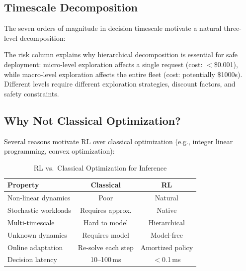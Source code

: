 \documentclass[conference,10pt]{IEEEtran}
\begin{document}
\subsection{Timescale Decomposition}

The seven orders of magnitude in decision timescale motivate a natural three-level decomposition:

\begin{table}[!htbp]
\caption{Decision Timescale Decomposition}
\label{tab:timescale}
\centering\scriptsize
{}
\end{table}

The risk column explains why hierarchical decomposition is essential for safe deployment: micro-level exploration affects a single request (cost: $<$\$0.001), while macro-level exploration affects the entire fleet (cost: potentially \$1000s). Different levels require different exploration strategies, discount factors, and safety constraints.


\subsection{Why Not Classical Optimization?}

Several reasons motivate RL over classical optimization (e.g., integer linear programming, convex optimization):

\begin{table}[!htbp]
\caption{RL vs.\ Classical Optimization for Inference}
\label{tab:whyrl}
\centering\scriptsize
\begin{tabular}{@{}lcc@{}}
\toprule
\textbf{Property} & \textbf{Classical} & \textbf{RL} \\
\midrule
Non-linear dynamics & Poor & Natural \\
Stochastic workloads & Requires approx. & Native \\
Multi-timescale & Hard to model & Hierarchical \\
Unknown dynamics & Requires model & Model-free \\
Online adaptation & Re-solve each step & Amortized policy \\
Decision latency & 10--100\,ms & $<$0.1\,ms \\
\bottomrule
\end{tabular}
\end{table}
\end{document}
